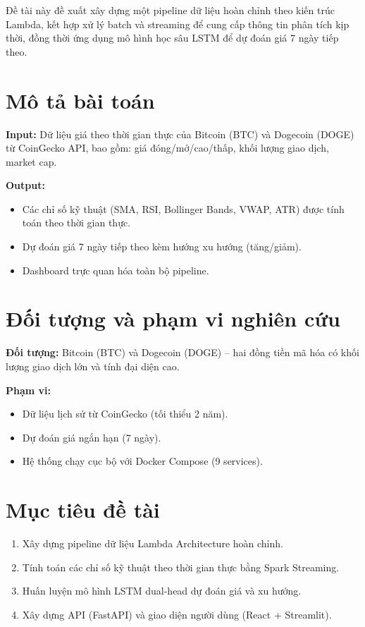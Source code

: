 \documentclass[12pt, a4paper]{report}
\begin{document}
Đề tài này đề xuất xây dựng một pipeline dữ liệu hoàn chỉnh theo kiến trúc Lambda, kết hợp xử lý batch và streaming để cung cấp thông tin phân tích kịp thời, đồng thời ứng dụng mô hình học sâu LSTM để dự đoán giá 7 ngày tiếp theo.

\section{Mô tả bài toán}

\textbf{Input:} Dữ liệu giá theo thời gian thực của Bitcoin (BTC) và Dogecoin (DOGE) từ CoinGecko API, bao gồm: giá đóng/mở/cao/thấp, khối lượng giao dịch, market cap.

\textbf{Output:}
\begin{itemize}
  \item Các chỉ số kỹ thuật (SMA, RSI, Bollinger Bands, VWAP, ATR) được tính toán theo thời gian thực.
  \item Dự đoán giá 7 ngày tiếp theo kèm hướng xu hướng (tăng/giảm).
  \item Dashboard trực quan hóa toàn bộ pipeline.
\end{itemize}

\section{Đối tượng và phạm vi nghiên cứu}

\textbf{Đối tượng:} Bitcoin (BTC) và Dogecoin (DOGE) -- hai đồng tiền mã hóa có khối lượng giao dịch lớn và tính đại diện cao.

\textbf{Phạm vi:}
\begin{itemize}
  \item Dữ liệu lịch sử từ CoinGecko (tối thiểu 2 năm).
  \item Dự đoán giá ngắn hạn (7 ngày).
  \item Hệ thống chạy cục bộ với Docker Compose (9 services).
\end{itemize}

\section{Mục tiêu đề tài}

\begin{enumerate}
  \item Xây dựng pipeline dữ liệu Lambda Architecture hoàn chỉnh.
  \item Tính toán các chỉ số kỹ thuật theo thời gian thực bằng Spark Streaming.
  \item Huấn luyện mô hình LSTM dual-head dự đoán giá và xu hướng.
  \item Xây dựng API (FastAPI) và giao diện người dùng (React + Streamlit).
\end{enumerate}
\end{document}
